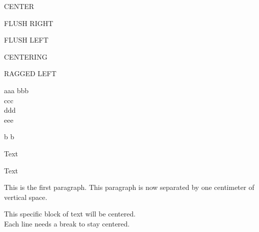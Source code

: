 \documentclass{article}
\begin{document}
\begin{center}
CENTER
\end{center}

\begin{flushright} FLUSH RIGHT \end{flushright}

\begin{flushleft} FLUSH LEFT \end{flushleft}

{\centering CENTERING \par}

{\raggedleft RAGGED LEFT \par}





\noindent
aaa \newline
bbb \\
ccc \\[2em]
ddd \\[2cm]
eee

b
b


\raggedright
    Text

\raggedleft
    Text

\noindent


This is the first paragraph.
\vspace{1cm} This paragraph is now separated by one centimeter of vertical space.


{\centering
This specific block of text will be centered. \\
Each line needs a break to stay centered. \par
}
\end{document}
